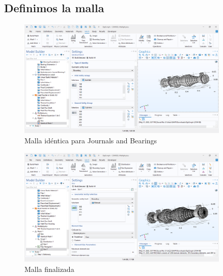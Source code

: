 \documentclass{article}
\theoremstyle{mytheoremstyle}
\theoremstyle{mytheoremstyle}
\theoremstyle{myproblemstyle}
\begin{document}
            \subsection{Definimos la malla}
             \begin{figure}[H]
              \centering
              \includegraphics[width=0.9\textwidth]{id1.png}
              \caption{Malla idéntica para Journals and Bearings}
              \label{fig:comsol_malla_identica_journals_bearings} %
            \end{figure}
             \begin{figure}[H]
              \centering
              \includegraphics[width=0.9\textwidth]{mesg.png}
              \caption{Malla finalizada}
              \label{fig:comsol_malla_finalizada_img} %
            \end{figure}
\end{document}
